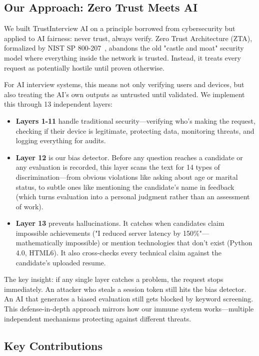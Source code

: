 \documentclass[conference]{IEEEtran}
\begin{document}
\subsection{Our Approach: Zero Trust Meets AI}

We built TrustInterview AI on a principle borrowed from cybersecurity but applied to AI fairness: never trust, always verify. Zero Trust Architecture (ZTA), formalized by NIST SP 800-207~\cite{rose2020zero}, abandons the old "castle and moat" security model where everything inside the network is trusted. Instead, it treats every request as potentially hostile until proven otherwise.

For AI interview systems, this means not only verifying users and devices, but also treating the AI's own outputs as untrusted until validated. We implement this through 13 independent layers:

\begin{itemize}
\item \textbf{Layers 1-11} handle traditional security—verifying who's making the request, checking if their device is legitimate, protecting data, monitoring threats, and logging everything for audits.

\item \textbf{Layer 12} is our bias detector. Before any question reaches a candidate or any evaluation is recorded, this layer scans the text for 14 types of discrimination—from obvious violations like asking about age or marital status, to subtle ones like mentioning the candidate's name in feedback (which turns evaluation into a personal judgment rather than an assessment of work).

\item \textbf{Layer 13} prevents hallucinations. It catches when candidates claim impossible achievements ("I reduced server latency by 150\%"—mathematically impossible) or mention technologies that don't exist (Python 4.0, HTML6). It also cross-checks every technical claim against the candidate's uploaded resume.
\end{itemize}

The key insight: if any single layer catches a problem, the request stops immediately. An attacker who steals a session token still hits the bias detector. An AI that generates a biased evaluation still gets blocked by keyword screening. This defense-in-depth approach mirrors how our immune system works—multiple independent mechanisms protecting against different threats.

\subsection{Key Contributions}
\end{document}
